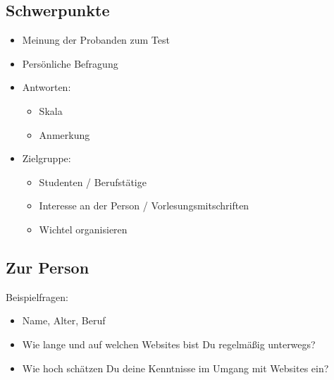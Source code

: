 
\subsection{Schwerpunkte}
\begin{frame}
	\begin{itemize}\pause
		\item Meinung der Probanden zum Test \pause
		\item Persönliche Befragung	\pause
		\item Antworten: \pause
		\begin{itemize}
			\item Skala \pause
			\item Anmerkung \pause
		\end{itemize}
		\item Zielgruppe: \pause
		\begin{itemize}
			\item Studenten / Berufstätige \pause
			\item Interesse an der Person / Vorlesungsmitschriften \pause
			\item Wichtel organisieren
		\end{itemize}
	\end{itemize}
\end{frame}

\subsection{Zur Person}
\begin{frame}
	Beispielfragen: \pause
	\begin{itemize} 
		\item Name, Alter, Beruf \pause
		\item Wie lange und auf welchen Websites bist Du regelmäßig unterwegs? \pause
		\item Wie hoch schätzen Du deine Kenntnisse im Umgang mit Websites ein?
	\end{itemize}

	
\end{frame}

